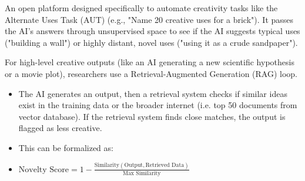 \documentclass{article}
\begin{document}
\begin{describe}
\begin{itemize}
\begin{itemize}
    \end{itemize}
    \item[SemDis (Semantic Distance Platform)] An open platform designed specifically to automate creativity tasks like the Alternate Uses Task (AUT) (e.g., "Name 20 creative uses for a brick"). It passes the AI's answers through unsupervised space to see if the AI suggests typical uses ("building a wall") or highly distant, novel uses ("using it as a crude sandpaper").
    \item[RAG-Based Novelty Checkers] For high-level creative outputs (like an AI generating a new scientific hypothesis or a movie plot), researchers use a Retrieval-Augmented Generation (RAG) loop.
    \begin{itemize}
        \item The AI generates an output, then a retrieval system checks if similar ideas exist in the training data or the broader internet (i.e. top 50 documents from vector database). If the retrieval system finds close matches, the output is flagged as less creative.
        \item This can be formalized as:
        \item $\text{Novelty Score} = 1 - \frac{\text{Similarity}(\text{Output}, \text{Retrieved Data})}{\text{Max Similarity}}$
    \end{itemize}
\end{describe}
\end{document}
